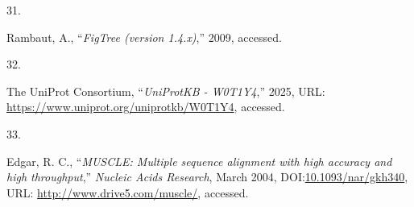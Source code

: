 \documentclass[
]{article}
\newlength{\cslhangindent}
\newlength{\csllabelwidth}
\newenvironment{CSLReferences}[2] %
 {\begin{list}{}{%
  \setlength{\itemindent}{0pt}
  \setlength{\leftmargin}{0pt}
  \setlength{\parsep}{0pt}
  \ifodd #1
   \setlength{\leftmargin}{\cslhangindent}
   \setlength{\itemindent}{-1\cslhangindent}
  \fi
  \setlength{\itemsep}{#2\baselineskip}}}
 {\end{list}}
\newcommand{\CSLLeftMargin}[1]{\parbox[t]{\csllabelwidth}{\strut#1\strut}}
\newcommand{\CSLRightInline}[1]{\parbox[t]{\linewidth - \csllabelwidth}{\strut#1\strut}}
\begin{document}
\begin{CSLReferences}{0}{1}
\CSLLeftMargin{31. }%
\CSLRightInline{Rambaut, A., {``\emph{{FigTree} (version 1.4.x)},''}
2009, accessed.}

\CSLLeftMargin{32. }%
\CSLRightInline{The UniProt Consortium, {``\emph{UniProtKB - W0T1Y4},''}
2025, URL: \url{https://www.uniprot.org/uniprotkb/W0T1Y4}, accessed.}

\CSLLeftMargin{33. }%
\CSLRightInline{Edgar, R. C., {``\emph{{MUSCLE}: Multiple sequence
alignment with high accuracy and high throughput},''} \emph{Nucleic
Acids Research}, March 2004,
DOI:\href{https://doi.org/10.1093/nar/gkh340}{10.1093/nar/gkh340}, URL:
\url{http://www.drive5.com/muscle/}, accessed.}

\end{CSLReferences}
\end{document}
